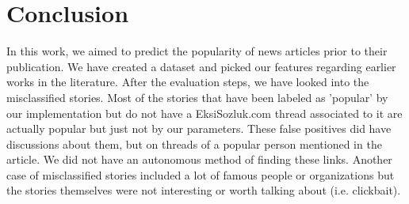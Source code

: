 \documentclass[conference]{IEEEtran}
\begin{document}

\section{Conclusion}
In this work, we aimed to predict the popularity of news articles prior to their publication. We have created a dataset and picked our features regarding earlier works in the literature. After the evaluation steps, we have looked into the misclassified stories. Most of the stories that have been labeled as 'popular' by our implementation but do not have a EksiSozluk.com thread associated to it are actually popular but just not by our parameters. These false positives did have discussions about them, but on threads of a popular person mentioned in the article. We did not have an autonomous method of finding these links. Another case of misclassified stories included a lot of famous people or organizations but the stories themselves were not interesting or worth talking about (i.e. clickbait).


%
%




%
%
\end{document}
